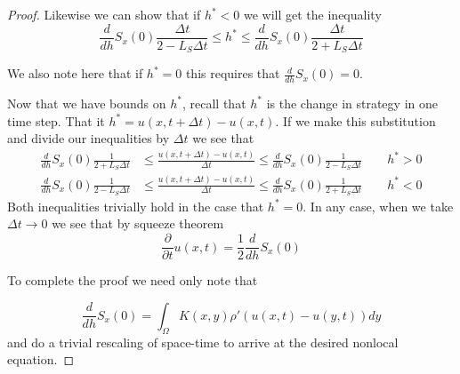 \documentclass[10pt,a4paper]{amsart}
\begin{document}
\begin{proof}
        Likewise we can show that if $h^*<0$ we will get the inequality 
        \begin{equation*}
            \frac{d}{dh}S_x(0)\frac{\Delta t}{2-L_S\Delta t}\leq h^*\leq \frac{d}{dh}S_x(0)\frac{\Delta t}{2+L_S\Delta t}
        \end{equation*}

        We also note here that if $h^*=0$ this requires that $\frac{d}{dh}S_x(0)=0$. 

        Now that we have bounds on $h^*$, recall that $h^*$ is the change in strategy in one time step. That it $h^*=u(x,t+\Delta t)-u(x,t)$. If we make this substitution and divide our inequalities by $\Delta t$ we see that 
        \begin{equation*}
            \begin{split}
                \frac{d}{dh}S_x(0)\frac{1}{2+L_S\Delta t}&\leq \frac{u(x,t+\Delta t)-u(x,t)}{\Delta t}\leq\frac{d}{dh}S_x(0)\frac{1}{2-L_S\Delta t}\quad \quad h^*>0\\
                \frac{d}{dh}S_x(0)\frac{1}{2-L_S\Delta t}&\leq \frac{u(x,t+\Delta t)-u(x,t)}{\Delta t}\leq\frac{d}{dh}S_x(0)\frac{1}{2+L_S\Delta t}\quad \quad h^*<0
            \end{split}
        \end{equation*}
        Both inequalities trivially hold in the case that $h^*=0$. In any case, when we take $\Delta t\to 0$ we see that by squeeze theorem 
        \begin{equation*}
            \frac{\partial}{\partial t}u(x,t)=\frac{1}{2}\frac{d}{dh}S_x(0)
        \end{equation*}

        To complete the proof we need only note that 
        
       \[\frac{d}{dh}S_x(0)=\int_\Omega K(x,y)\rho'(u(x,t)-u(y,t))dy\] and do a trivial rescaling of space-time to arrive at the desired nonlocal equation.
        \end{proof}
\end{document}
